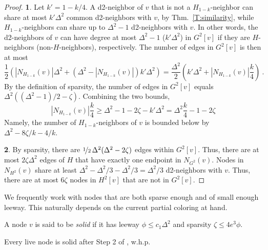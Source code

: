  \begin{proof}
\textbf{1}. 
Let $k' = 1 - k/4$.
A d2-neighbor of $v$ that is not a $H_{1-k}$-neighbor can share at most $k' \Delta^2$ common d2-neighbors with $v$, by Thm.~\ref{T:similarity}, while $H_{1-k}$-neighbors can share up to $\Delta^2-1$ d2-neighbors with $v$.
In other words, the d2-neighbors of $v$ can have degree at most 
$\Delta^2-1$ ($k'\Delta^2$) in $G^2[v]$ if they are $H$-neighbors (non-$H$-neighbors), respectively.
The number of edges in $G^2[v]$ is then at most
\[ \frac{1}{2}\left( |N_{H_{1-k}}(v)| \Delta^2 + (\Delta^2 - |N_{H_{1-k}}(v)|) k' \Delta^2\right) = 
\frac{\Delta^2}{2} \left(k' \Delta^2 + |N_{H_{1-k}}(v)| \frac{k}{4}\right) \ . \]
By the definition of sparsity, the number of edges in $G^2[v]$ equals $\Delta^2((\Delta^2-1)/2 - \zeta)$.
Combining the two bounds, 
\[ |N_{H_{1-k}}(v)| \frac{k}{4} \ge \Delta^2 - 1 - 2\zeta - k'\Delta^2 
  = \Delta^2 \frac{k}{4}  - 1 - 2\zeta \]
Namely, the number of $H_{1-k}$-neighbors of $v$ is bounded below by $\Delta^2 - 8\zeta/k -4/k$.

\textbf{2}. By sparsity, there are $\nicefrac{1}{2}\, \Delta^2(\Delta^2 - 2\zeta)$ edges within $G^2[v]$. Thus, there are at most $2\zeta \Delta^2$ edges of $H$ that have exactly one endpoint in $N_{G^2}(v)$. Nodes in $N_{H^2}(v)$ share at least $\Delta^2 - \Delta^2/3 - \Delta^2/3 = \Delta^2/3$ d2-neighbors with $v$. Thus, there are at most $6\zeta$ nodes in $H^2[v]$ that are not in $G^2[v]$.
\end{proof}


We frequently work with nodes that are both sparse enough and of small enough leeway. This naturally depends on the current partial coloring at hand.
\begin{definition}
A node $v$ is said to be \emph{solid} if it has leeway $\phi \le c_1 \Delta^2$ and sparsity $\zeta \le 4 e^3 \phi$. 
\label{D:solid}
\end{definition}


\begin{observation}
Every live node is solid after Step 2 of , w.h.p.
\label{O:sparse}
\end{observation}

